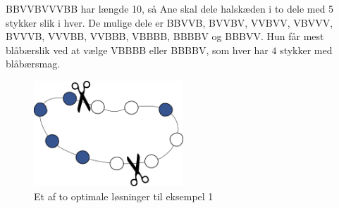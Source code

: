 BBVVBVVVBB har længde 10, så Ane skal dele halskæden i to dele med 5 stykker slik i hver.
De mulige dele er BBVVB, BVVBV, VVBVV, VBVVV, BVVVB, VVVBB, VVBBB, VBBBB, BBBBV og BBBVV.
Hun får mest blåbærslik ved at vælge VBBBB eller BBBBV, som hver har $4$ stykker med blåbærsmag.

\begin{figure}[h]
	\centering
\includegraphics[width=0.5\textwidth]{sample1}
\caption{Et af to optimale løsninger til eksempel 1}
\end{figure}
